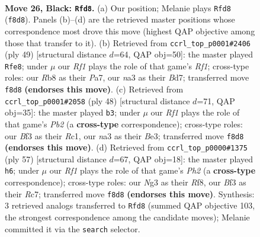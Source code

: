 \documentclass[11pt]{article}
\begin{document}
\clearpage

\begin{figure}[p]\centering
\begin{subfigure}{0.46\textwidth}\centering
\resizebox{\linewidth}{!}{%
\newchessgame
\chessboard[
  setfen={1r3r2/pp4k1/6pp/2pB4/4pP1P/N3Pbn1/PP3K2/1RB5 b - - 1 26},
  showmover=false,
  pgfstyle=straightmove, color=movearrow, markmove={f8-d8}
]}
\caption{}
\end{subfigure}\hfill
\begin{subfigure}{0.46\textwidth}\centering
\resizebox{\linewidth}{!}{%
\newchessgame
\chessboard[
  setfen={5rk1/p2b1pp1/2p5/1p2rP1N/2n3PP/2PB4/P1P5/2K1R2R b - - 2 25},
  showmover=false,
  pgfstyle=straightmove, color=movearrow, markmove={f8-e8}
]}
\caption{}
\end{subfigure}
\\[4pt]
\begin{subfigure}{0.46\textwidth}\centering
\resizebox{\linewidth}{!}{%
\newchessgame
\chessboard[
  setfen={4r1k1/3n1p2/p1rPpp1p/3b4/PpN5/4B2P/1P3PP1/2RR2K1 w - - 0 25},
  showmover=false,
  pgfstyle=straightmove, color=movearrow, markmove={b2-b3}
]}
\caption{}
\end{subfigure}\hfill
\begin{subfigure}{0.46\textwidth}\centering
\resizebox{\linewidth}{!}{%
\newchessgame
\chessboard[
  setfen={5rk1/2r1bppp/3p4/1p1Bp1P1/1P5P/2P2P2/P2B4/1K2R3 b - - 0 29},
  showmover=false,
  pgfstyle=straightmove, color=movearrow, markmove={h7-h6}
]}
\caption{}
\end{subfigure}
\caption{\textbf{Move 26, Black: \texttt{Rfd8}.} (a) Our position; Melanie plays \texttt{Rfd8} (\texttt{f8d8}). Panels (b)--(d) are the retrieved master positions whose correspondence most drove this move (highest QAP objective among those that transfer to it). (b) Retrieved from \texttt{ccrl\_top\_p0001\#2406} (ply 49) [structural distance $d$=64, QAP obj=50]: the master played \texttt{Rfe8}; under $\mu$ our \emph{Rf1} plays the role of that game's \emph{Rf1}; cross-type roles: our \emph{R}b8 as their \emph{P}a7, our \emph{n}a3 as their \emph{B}d7; transferred move \texttt{f8d8} \textbf{(endorses this move)}. (c) Retrieved from \texttt{ccrl\_top\_p0001\#2058} (ply 48) [structural distance $d$=71, QAP obj=35]: the master played \texttt{b3}; under $\mu$ our \emph{Rf1} plays the role of that game's \emph{Pb2} (a \textbf{cross-type} correspondence); cross-type roles: our \emph{B}f3 as their \emph{R}c1, our \emph{n}a3 as their \emph{B}e3; transferred move \texttt{f8d8} \textbf{(endorses this move)}. (d) Retrieved from \texttt{ccrl\_top\_p0000\#1375} (ply 57) [structural distance $d$=67, QAP obj=18]: the master played \texttt{h6}; under $\mu$ our \emph{Rf1} plays the role of that game's \emph{Ph2} (a \textbf{cross-type} correspondence); cross-type roles: our \emph{N}g3 as their \emph{R}f8, our \emph{B}f3 as their \emph{R}c7; transferred move \texttt{f8d8} \textbf{(endorses this move)}. Synthesis: 3 retrieved analogs transferred to \texttt{Rfd8} (summed QAP objective 103, the strongest correspondence among the candidate moves); Melanie committed it via the \texttt{search} selector.}
\label{fig:thought-m51}
\end{figure}
\end{document}
